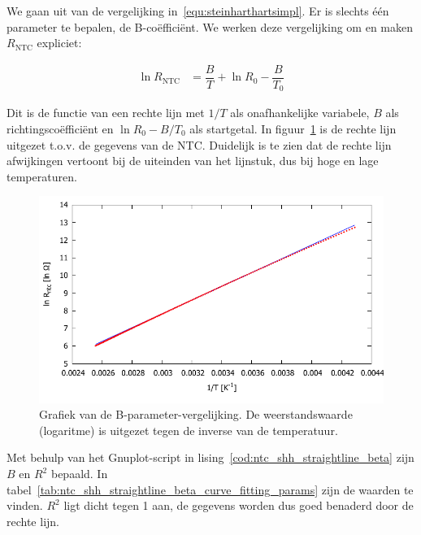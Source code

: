\documentclass[12pt,a4paper,final,twoside,fleqn]{article}
\newcommand{\rntc}{R_\text{NTC}}
\begin{document}
We gaan uit van de vergelijking in~\eqref{equ:steinharthartsimpl}. Er is slechts \'e\'en
parameter te bepalen, de B-co\"effici\"ent. We werken deze vergelijking om en maken $\rntc$
expliciet:

\begin{equation}
\begin{split}
\ln \rntc &= \dfrac{B}{T} + \ln R_0 - \dfrac{B}{T_0} 
\end{split}
\end{equation}

Dit is de functie van een rechte lijn met $1/T$ als onafhankelijke variabele, $B$
als richtingsco\"effici\"ent en $\ln R_0-B/T_0$ als startgetal.
In figuur~\ref{fig:ntc_shh_straightline_beta_fig} is de rechte lijn uitgezet t.o.v.\@
de gegevens van de NTC. Duidelijk is te zien dat de rechte lijn afwijkingen vertoont
bij de uiteinden van het lijnstuk, dus bij hoge en lage temperaturen.

\begin{figure}[t!]
\centering
\includegraphics[scale=1]{gnuplot/ntc_shh_straightline_beta_fig}
\caption[Grafiek van de B-parameter-vergelijking]{Grafiek van de B-parameter-vergelijking. De weerstandswaarde (logaritme) is uitgezet tegen de inverse van de temperatuur.}
\label{fig:ntc_shh_straightline_beta_fig}
\end{figure}

Met behulp van het Gnuplot-script in lising~\ref{cod:ntc_shh_straightline_beta}
zijn $B$ en $R^2$ bepaald.
In tabel~\ref{tab:ntc_shh_straightline_beta_curve_fitting_params} zijn de waarden
te vinden. $R^2$ ligt dicht tegen 1 aan, de gegevens worden dus goed benaderd door
de rechte lijn.
\end{document}
